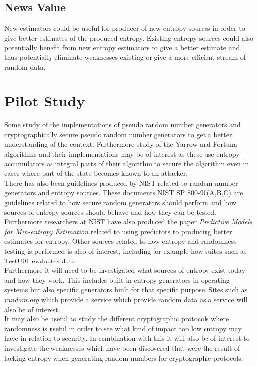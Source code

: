 \documentclass[a4paper,11pt]{report}
\begin{document}
\subsection*{News Value}
New estimators could be useful for producer of new entropy sources in order to
give better estimates of the produced entropy. Existing entropy sources could
also potentially benefit from new entropy estimators to give a better estimate
and thus potentially eliminate weaknesses existing or give a more efficient 
stream of random data.

\section*{Pilot Study}
Some study of the implementations of pseudo random number generators and
cryptographically secure pseudo random number generators to get a better
understanding of the context. Furthermore study of the Yarrow and
Fortuna algorithms and their implementations may be of interest as these 
use entropy accumulators as integral parts of their algorithm to secure the 
algorithm even in cases where part of the state becomes known to an attacker.
\\

\noindent
There has also been guidelines produced by NIST related to random number
generators and entropy sources. These documents NIST SP 800-90(A,B,C) 
\cite{800-90A}\cite{800-90B}\cite{800-90C} are guidelines related to 
how secure random generators should perform and how sources of entropy 
sources should behave and how they can be tested.
Furthermore researchers at NIST have also produced 
the paper \textit{Predictive Models for Min-entropy Estimation}
\cite{eprint-2015-26658}
related to using predictors to producing better estimates for entropy.
Other sources related to how entropy and randomness testing is performed is
also of interest, including for example how suites such as TestU01 evaluates
data.
\\

\noindent
Furthermore it will need to be investigated what sources of entropy exist today
and how they work. This includes built in entropy generators in operating 
systems but also specific generators built for that specific purpose. Sites
such as \textit{random.org} which provide a service which provide random 
data as a service will also be of interest.
\\

\noindent
It may also be useful to study the different cryptographic protocols 
where randomness is useful in order to see what kind of impact too low entropy 
may have in relation to security. In combination with this it will also be 
of interest to investigate the weaknesses which have been discovered that were 
the result of lacking entropy when generating random numbers for cryptographic 
protocols.
\end{document}
